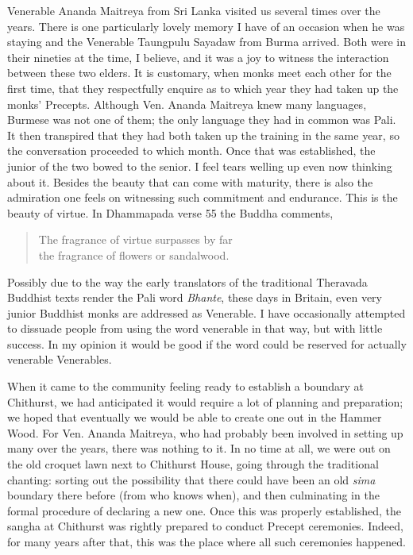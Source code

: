 Venerable Ananda Maitreya\cite{ananda}
from Sri Lanka visited us several times over
the years. There is one particularly lovely memory I have of an occasion
when he was staying and the Venerable Taungpulu Sayadaw\cite{taungpulu}
from Burma arrived. Both were in their
nineties at the time, I believe, and it was a joy to witness the
interaction between these two elders. It is customary, when monks meet
each other for the first time, that they respectfully enquire as to
which year they had taken up the monks' Precepts. Although Ven. Ananda
Maitreya knew many languages, Burmese was not one of them; the only
language they had in common was Pali. It then transpired that they had
both taken up the training in the same year, so the conversation
proceeded to which month. Once that was established, the junior of the
two bowed to the senior. I feel tears welling up even now thinking about
it. Besides the beauty that can come with maturity, there is also the
admiration one feels on witnessing such commitment and endurance. This
is the beauty of virtue. In Dhammapada verse 55 the Buddha comments,

\begin{quote}
  The fragrance of virtue surpasses by far\\
  the fragrance of flowers or sandalwood.
\end{quote}

Possibly due to the way the early translators of the traditional
Theravada Buddhist texts render the Pali word \emph{Bhante}, these days
in Britain, even very junior Buddhist monks are addressed as Venerable.
I have occasionally attempted to dissuade people from using the word
venerable in that way, but with little success. In my opinion it would
be good if the word could be reserved for actually venerable
Venerables.


\enlargethispage{\baselineskip}

When it came to the community feeling ready to establish a boundary\cite{sima}
at Chithurst, we had anticipated it would
require a lot of planning and preparation; we hoped that eventually we
would be able to create one out in the Hammer Wood. For Ven. Ananda
Maitreya, who had probably been involved in setting up many over the
years, there was nothing to it. In no time at all, we were out on the
old croquet lawn next to Chithurst House, going through the traditional
chanting: sorting out the possibility that there could have been an old
\emph{sima} boundary there before (from who knows when), and then
culminating in the formal procedure of declaring a new one. Once this
was properly established, the sangha at Chithurst was rightly prepared
to conduct Precept ceremonies. Indeed, for many years after that, this
was the place where all such ceremonies happened.

